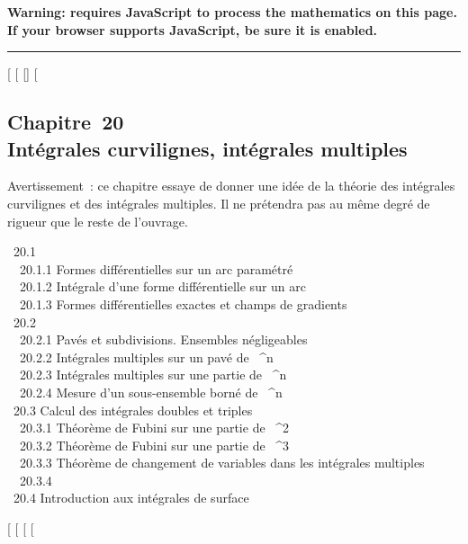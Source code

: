 \textbf{Warning: 
requires JavaScript to process the mathematics on this page.\\ If your
browser supports JavaScript, be sure it is enabled.}

\begin{center}\rule{3in}{0.4pt}\end{center}

{[}
{[}
{[}{]}
{[}

\subsection{Chapitre~20\\Intégrales curvilignes, intégrales multiples}

Avertissement~: ce chapitre essaye de donner une idée de la théorie des
intégrales curvilignes et des intégrales multiples. Il ne prétendra pas
au même degré de rigueur que le reste de l'ouvrage.

~20.1  \\
~~20.1.1 {Formes
différentielles sur un arc paramétré} \\ ~~20.1.2
{Intégrale d'une forme
différentielle sur un arc} \\ ~~20.1.3
{Formes différentielles exactes
et champs de gradients} \\ ~20.2
 \\
~~20.2.1 {Pavés et
subdivisions. Ensembles négligeables} \\ ~~20.2.2
{Intégrales multiples sur un
pavé de ~^n} \\ ~~20.2.3
{Intégrales multiples sur une
partie de ~^n} \\ ~~20.2.4
{Mesure d'un sous-ensemble
borné de ~^n} \\ ~20.3
{Calcul des intégrales doubles et
triples} \\ ~~20.3.1 {Théorème
de Fubini sur une partie de ~^2} \\ ~~20.3.2
{Théorème de Fubini sur une
partie de ~^3} \\ ~~20.3.3
{Théorème de changement de
variables dans les intégrales multiples} \\ ~~20.3.4
 \\
~20.4 {Introduction aux
intégrales de surface}

{[}
{[}
{[}
{[}
